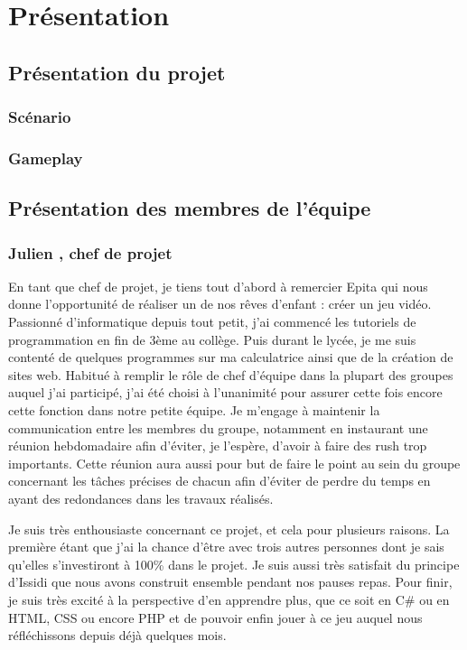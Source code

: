 ﻿\documentclass[12pt]{article}
\begin{document}
\section{Présentation}
\subsection{Présentation du projet}
\subsubsection{Scénario}

\subsubsection{Gameplay}


\subsection{Présentation des membres de l'équipe}
\subsubsection{Julien , chef de projet}
En tant que chef de projet, je tiens tout d'abord à remercier Epita qui nous
donne l'opportunité de réaliser un de nos rêves d'enfant : créer un jeu vidéo.
Passionné d'informatique depuis tout petit, j'ai commencé les tutoriels de
programmation en fin de 3ème au collège. Puis durant le lycée, je me suis contenté
de quelques programmes sur ma calculatrice ainsi que de la création de sites web.
Habitué à remplir le rôle de chef d'équipe dans la plupart des groupes auquel
j'ai participé, j'ai été choisi à l'unanimité pour assurer cette fois encore
cette fonction dans notre petite équipe. Je m'engage à maintenir la communication
entre les membres du groupe, notamment en instaurant une réunion hebdomadaire afin
d'éviter, je l'espère, d'avoir à faire des rush trop importants. Cette réunion aura
aussi pour but de faire le point au sein du groupe concernant les tâches précises 
de chacun afin d'éviter de perdre du temps en ayant des redondances dans les travaux
réalisés.

Je suis très enthousiaste concernant ce projet, et cela pour plusieurs raisons.
La première étant que j'ai la chance d'être avec trois autres personnes dont je sais
qu'elles s'investiront à 100\% dans le projet. Je suis aussi très satisfait du principe
d'Issidi que nous avons construit ensemble pendant nos pauses repas. Pour finir, je
suis très excité à la perspective d'en apprendre plus, que ce soit en C\# ou en HTML,
CSS ou encore PHP et de pouvoir enfin jouer à ce jeu auquel nous réfléchissons depuis
déjà quelques mois.
\end{document}
